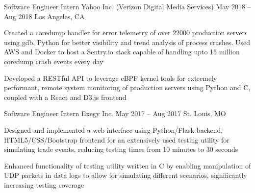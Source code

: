 \documentclass[letterpaper]{resume_config}
\begin{document}
\WorkExperience
    {Software Engineer Intern} %
    {Yahoo Inc. (Verizon Digital Media Services)} %
    {May 2018 -- Aug 2018} %
    {Los Angeles, CA} %
    {
        \item Created a coredump handler for error telemetry of over 22000 production servers using gdb, Python for better visibility and trend analysis of process crashes. Used AWS and Docker to host a Sentry.io stack capable of handling upto 15 million coredump crash events every day
        \item Developed a RESTful API to leverage eBPF kernel tools for extremely performant, remote system monitoring of production servers using Python and C, coupled with a React and D3.js frontend
    }

\WorkExperience
    {Software Engineer Intern} %
    {Exegy Inc.} %
    {May 2017 -- Aug 2017} %
    {St. Louis, MO} %
    {
        \item Designed and implemented a web interface using Python/Flask backend, HTML5/CSS/Bootstrap frontend for an extensively used testing utility for simulating trade events, reducing testing times from 10 minutes to 30 seconds
        \item Enhanced functionality of testing utility written in C by enabling manipulation of UDP packets in data logs to allow for simulating different scenarios, significantly increasing testing coverage
    }

\vspace{-10pt}



\end{document}
